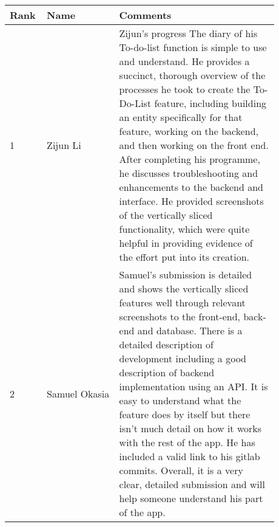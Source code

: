 \documentclass[a4paper]{article}
\begin{document}
{\noindent\begin{tabular}{|p{0.075\linewidth}|p{0.25\linewidth}|p{0.55\linewidth}|} 
	\hline
 \textbf{Rank} & \textbf{Name} & \textbf{Comments} \\
 \hline
 1 & Zijun Li & Zijun's progress The diary of his To-do-list function is simple to use and understand.
 He provides a succinct, thorough overview of the processes he took to create the To-Do-List feature, including building an entity specifically for that feature, working on the backend, and then working on the front end.
 After completing his programme, he discusses troubleshooting and enhancements to the backend and interface.
 He provided screenshots of the vertically sliced functionality, which were quite helpful in providing evidence of the effort put into its creation.\\
 \hline
 2 & Samuel Okasia & Samuel's submission is detailed and shows the vertically sliced features well through relevant screenshots to the front-end, back-end and database. There is a detailed description of development including a good description of backend implementation using an API. It is easy to understand what the feature does by itself but there isn't much detail on how it works with the rest of the app. He has included a valid link to his gitlab commits. Overall, it is a very clear, detailed submission and will help someone understand his part of the app.\\
 \hline
\end{tabular}}
\end{document}
